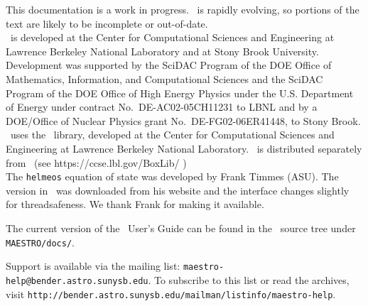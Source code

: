 This documentation is a work in progress.  \maestro\ is rapidly
evolving, so portions of the text are likely to be incomplete or
out-of-date. \\

\noindent \maestro\ is developed at the Center for Computational Sciences and
Engineering at Lawrence Berkeley National Laboratory and at Stony
Brook University.  Development was supported by the SciDAC Program of
the DOE Office of Mathematics, Information, and Computational Sciences
and the SciDAC Program of the DOE Office of High Energy Physics under
the U.S. Department of Energy under contract No.\ DE-AC02-05CH11231 to
LBNL and by a DOE/Office of Nuclear Physics grant No.\
DE-FG02-06ER41448, to Stony Brook.  \\

\noindent \maestro\ uses the \boxlib\ library,
developed at the Center for Computational Sciences and
Engineering at Lawrence Berkeley National Laboratory.  \boxlib\
is distributed separately from \maestro\ (see https:/\hspace{-0.25em}/ccse.lbl.gov/BoxLib/ )
\\

\noindent The {\tt helmeos} equation of state was developed by Frank Timmes (ASU).
The version in \maestro\ was downloaded from his website and the
interface changes slightly for threadsafeness.  We thank Frank for
making it available.

\noindent The current version of the \maestro\ User's Guide can be found in 
the \maestro\ source tree under {\tt MAESTRO/docs/}.


\noindent Support is available via the mailing list: {\tt maestro-help@bender.astro.sunysb.edu}.  To subscribe to this list or read the archives, visit
{\tt http://bender.astro.sunysb.edu/mailman/listinfo/maestro-help}.
